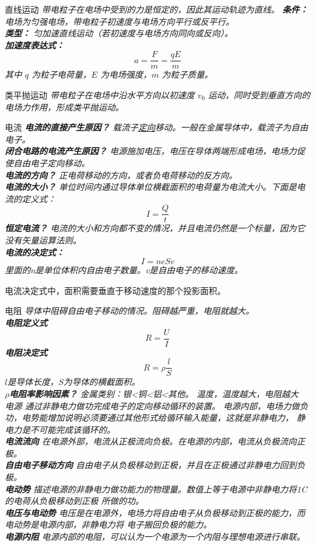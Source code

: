 \documentclass[a4paper, 12pt]{article}
\newcommand{\defitem}[2]{
  \noindent \textsf{#1} \hspace{1em} \itshape{#2} 
}
\newcommand{\noticebox}[1]{
  \begin{arcbox}
    \normalfont #1
  \end{arcbox}
}
\begin{document}
\defitem{直线运动}{
带电粒子在电场中受到的力是恒定的，因此其运动轨迹为直线。
  \textbf{条件：} 电场为匀强电场，带电粒子初速度与电场方向平行或反平行。\\
  \textbf{类型：} 匀加速直线运动（若初速度与电场方向同向或反向）。\\
  \textbf{加速度表达式：}
    \[
      a = \frac{F}{m} = \frac{qE}{m}
    \]
    其中 $q$ 为粒子电荷量，$E$ 为电场强度，$m$ 为粒子质量。\\
}
\defitem{类平抛运动}{
  带电粒子在电场中沿水平方向以初速度 $v_0$ 运动，同时受到垂直方向的电场力作用，形成类平抛运动。
}
\defitem{电流}{
  \textbf{电流的直接产生原因？}
  载流子\underline{定向}移动。一般在金属导体中，载流子为自由电子。\\
  \textbf{闭合电路的电流产生原因？}
  电源施加电压，电压在导体两端形成电场，电场力促使自由电子定向移动。\\
  \textbf{电流的方向？}
  正电荷移动的方向，或者负电荷移动的反方向。\\
  \textbf{电流的大小？}
  单位时间内通过导体单位横截面积的电荷量为电流大小。下面是电流的定义式：
  \[I=\frac Qt\]
  \textbf{恒定电流？}
  电流的大小和方向都不变的情况，并且电流仍然是一个标量，因为它没有矢量运算法则。\\
  \textbf{电流的决定式：}
  \[I=neSv\]
  里面的n是单位体积内自由电子数量。v是自由电子的移动速度。
}
\noticebox{电流决定式中，面积需要垂直于移动速度的那个投影面积。}
\defitem{电阻}{
  导体中阻碍自由电子移动的情况。阻碍越严重，电阻就越大。\\
  \textbf{电阻定义式}
  \[R=\frac UI\]
  \textbf{电阻决定式}
  \[R=\rho\frac lS\]
  $l$是导体长度，$S$为导体的横截面积。\\
  \textbf{$\rho$电阻率影响因素？}
  金属类别：银<铜<铝<其他。
  温度，温度越大，电阻越大
}\\
\defitem{电源}{
  通过非静电力做功完成电子的定向移动循环的装置。
  电源内部，电场力做负功，电势能增加说明必须要通过其他形式给循环输入能量，这就是非静电力，
  静电力是不可能完成该循环的。\\
  \textbf{电流流向}
  在电源外部，电流从正极流向负极。在电源的内部，电流从负极流向正极。\\
  \textbf{自由电子移动方向}
  自由电子从负极移动到正极，并且在正极通过非静电力回到负极。\\
  \textbf{电动势}
  描述电源的非静电力做功能力的物理量。数值上等于电源中非静电力将1C的电荷从负极移动到正极
  所做的功。\\
  \textbf{电压与电动势}
  电压是在电源外，电场力将自由电子从负极移动到正极的能力，而电动势是电源内部，非静电力将
  电子搬回负极的能力。\\
  \textbf{电源内阻}
  电源内部的电阻，可以认为一个电源为一个内阻与理想电源进行串联。\\
}
\end{document}

